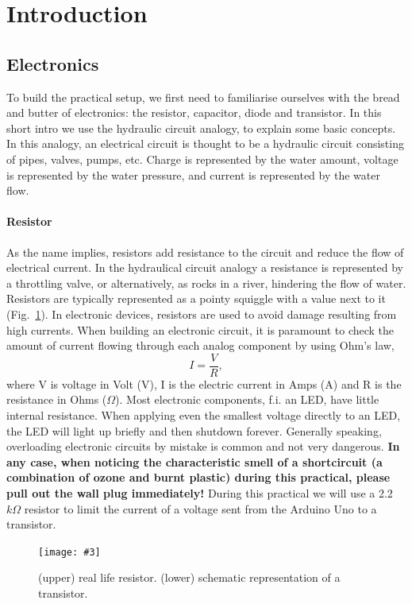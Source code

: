 \documentclass[10pt,twoside,openright]{article}
\newcommand{\mijnfiguur}[5][ht]{            %
    \begin{figure}[#1]                      %
        \begin{center}                      %
            \texttt{[image: \#3]}        %
        \end{center}
        \caption{#4\label{#5}}          %
    \end{figure}
    }
\begin{document}
\setcounter{tocdepth}{2}
\tableofcontents

\clearpage
\section{Introduction}

\subsection{Electronics}

To build the practical setup, we first need to familiarise ourselves with the bread and butter of electronics: the resistor, capacitor, diode and transistor. In this short intro we use the hydraulic circuit analogy, to explain some basic concepts. In this analogy, an electrical circuit is thought to be a hydraulic circuit consisting of pipes, valves, pumps, etc. Charge is represented by the water amount, voltage is represented by the water pressure, and current is represented by the water flow.

\paragraph{Resistor}
As the name implies, resistors add resistance to the circuit and reduce the flow of electrical current. In the hydraulical circuit analogy a resistance is represented by a throttling valve, or alternatively, as rocks in a river, hindering the flow of water. Resistors are typically represented as a pointy squiggle with a value next to it (Fig.~\ref{fig:resistor}). In electronic devices, resistors are used to avoid damage resulting from high currents. When building an electronic circuit, it is paramount to check the amount of current flowing through each analog component by using Ohm's law,
\begin{equation}
I = \frac{V}{R},
\label{eqn:Ohms law}
\end{equation}
where V is voltage in Volt (V), I is the electric current in Amps (A) and R is the resistance in Ohms ($\Omega$). Most electronic components, f.i. an LED, have little internal resistance. When applying even the smallest voltage directly to an LED, the LED will light up briefly and then shutdown forever. Generally speaking, overloading electronic circuits by mistake is common and not very dangerous. \textbf{In any case, when noticing the characteristic smell of a shortcircuit (a combination of ozone and burnt plastic) during this practical, please pull out the wall plug immediately!} During this practical we will use a 2.2 $k\Omega$ resistor to limit the current of a voltage sent from the Arduino Uno to a transistor.
\mijnfiguur[h!]{width=6cm}{resistor.jpg}{(upper) real life resistor. (lower) schematic representation of a transistor.}{fig:resistor}
\end{document}

